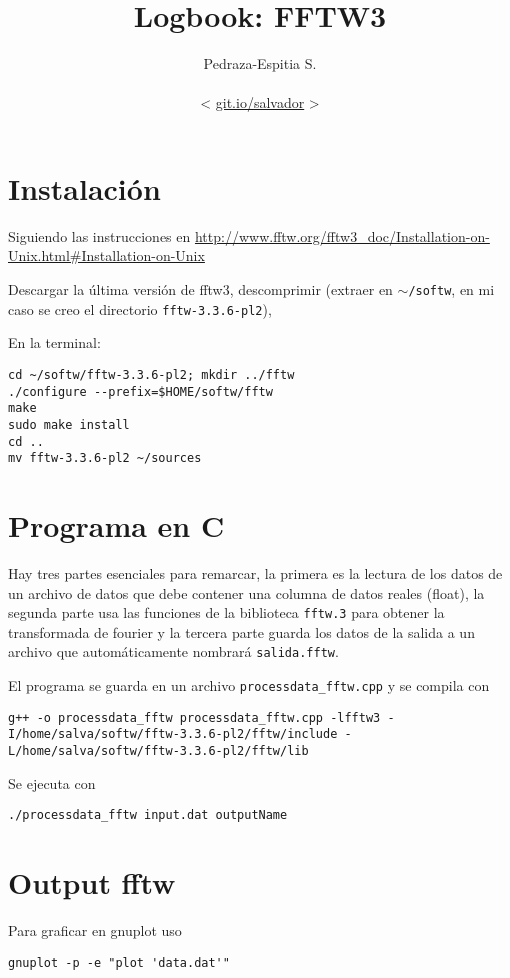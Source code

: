 \documentclass[letterpaper,11pt]{article}
\title{Logbook:  FFTW3}
\author{Pedraza-Espitia S.\\ \\< \url{git.io/salvador} >}
\date{}
\begin{document}
\maketitle
{}

%
%
\section{Instalación}
Siguiendo las instrucciones en \url{http://www.fftw.org/fftw3_doc/Installation-on-Unix.html#Installation-on-Unix}

Descargar la última versión de fftw3, descomprimir (extraer en $\sim$\verb|/softw|, en mi caso se creo el directorio \verb|fftw-3.3.6-pl2|), 

En la terminal:
\begin{lstlisting}
cd ~/softw/fftw-3.3.6-pl2; mkdir ../fftw
./configure --prefix=$HOME/softw/fftw
make
sudo make install
cd ..
mv fftw-3.3.6-pl2 ~/sources
\end{lstlisting}

\section{Programa en C}
\label{sec:progC}
Hay tres partes esenciales para remarcar, la primera es la lectura de los datos de un archivo de datos que debe contener una columna de datos reales (float), la segunda parte usa las funciones de la biblioteca \verb|fftw.3| para obtener la transformada de fourier y la tercera parte guarda los datos de la salida a un archivo que automáticamente nombrará \verb|salida.fftw|.


El programa se guarda en un archivo \verb|processdata_fftw.cpp| y se compila con\\
\begin{lstlisting}
g++ -o processdata_fftw processdata_fftw.cpp -lfftw3 -I/home/salva/softw/fftw-3.3.6-pl2/fftw/include -L/home/salva/softw/fftw-3.3.6-pl2/fftw/lib
\end{lstlisting}

Se ejecuta con
\begin{lstlisting}
./processdata_fftw input.dat outputName
\end{lstlisting}
\section{Output fftw}
\label{sec:output}
Para graficar en gnuplot uso
\begin{lstlisting}
gnuplot -p -e "plot 'data.dat'"
\end{lstlisting}
\end{document}
